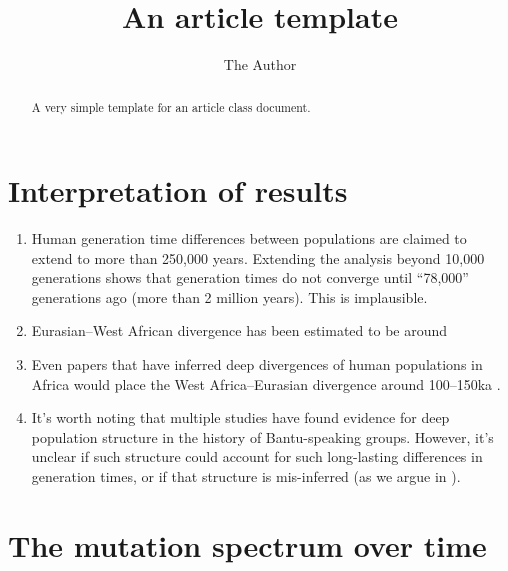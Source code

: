 \documentclass[]{article}
\begin{document}
\title{An article template}
\author[1,*]{The Author}
\maketitle

\begin{abstract}
A very simple template for an article class document.
\end{abstract}

\section{Interpretation of results}

\begin{enumerate}
    \item Human generation time differences between populations are claimed
        to extend to more than 250,000 years. Extending the analysis beyond
        10,000 generations shows that generation times do not converge
        until ``78,000'' generations ago (more than 2 million years).
        This is implausible.
    \item Eurasian--West African divergence has been estimated to be around
        \citep[e.g.,][]{pagani2015tracing}
    \item Even papers that have inferred deep divergences of human populations
        in Africa would place the West Africa--Eurasian divergence around
        100--150ka \citep[e.g.,][]{schlebusch2017southern}.
    \item It's worth noting that multiple studies have found evidence for
        deep population structure in the history of Bantu-speaking groups.
        However, it's unclear if such structure could account for such
        long-lasting differences in generation times, or if that structure
        is mis-inferred (as we argue in \citet{ragsdale2022weakly}).
\end{enumerate}

\section{The mutation spectrum over time}
\end{document}
